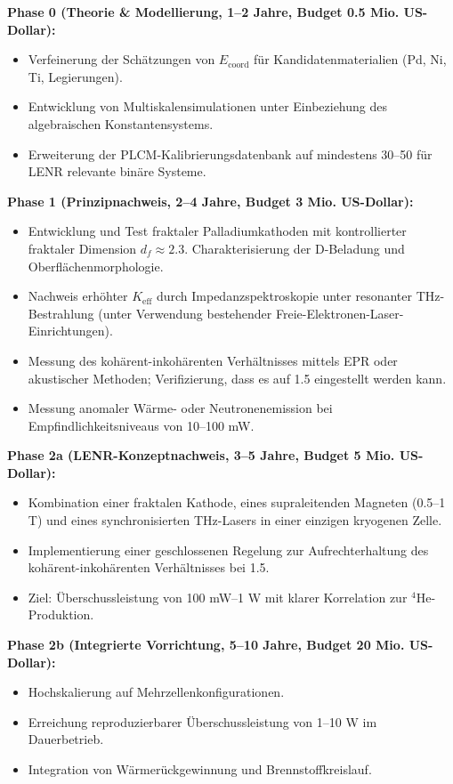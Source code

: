 \documentclass[12pt]{article}
\theoremstyle{remark}
\newcommand{\Keff}{K_{\mathrm{eff}}}
\begin{document}
	\textbf{Phase 0 (Theorie \& Modellierung, 1–2 Jahre, Budget 0.5 Mio. US-Dollar):}
	\begin{itemize}
		\item Verfeinerung der Schätzungen von \(E_{\mathrm{coord}}\) für Kandidatenmaterialien (Pd, Ni, Ti, Legierungen).
		\item Entwicklung von Multiskalensimulationen unter Einbeziehung des algebraischen Konstantensystems.
		\item Erweiterung der PLCM-Kalibrierungsdatenbank auf mindestens 30–50 für LENR relevante binäre Systeme.
	\end{itemize}
	
	\textbf{Phase 1 (Prinzipnachweis, 2–4 Jahre, Budget 3 Mio. US-Dollar):}
	\begin{itemize}
		\item Entwicklung und Test fraktaler Palladiumkathoden mit kontrollierter fraktaler Dimension \(d_f \approx 2.3\). Charakterisierung der D-Beladung und Oberflächenmorphologie.
		\item Nachweis erhöhter \(\Keff\) durch Impedanzspektroskopie unter resonanter THz-Bestrahlung (unter Verwendung bestehender Freie-Elektronen-Laser-Einrichtungen).
		\item Messung des kohärent-inkohärenten Verhältnisses mittels EPR oder akustischer Methoden; Verifizierung, dass es auf 1.5 eingestellt werden kann.
		\item Messung anomaler Wärme- oder Neutronenemission bei Empfindlichkeitsniveaus von 10–100 mW.
	\end{itemize}
	
	\textbf{Phase 2a (LENR-Konzeptnachweis, 3–5 Jahre, Budget 5 Mio. US-Dollar):}
	\begin{itemize}
		\item Kombination einer fraktalen Kathode, eines supraleitenden Magneten (0.5–1 T) und eines synchronisierten THz-Lasers in einer einzigen kryogenen Zelle.
		\item Implementierung einer geschlossenen Regelung zur Aufrechterhaltung des kohärent-inkohärenten Verhältnisses bei 1.5.
		\item Ziel: Überschussleistung von 100 mW–1 W mit klarer Korrelation zur \(^4\)He-Produktion.
	\end{itemize}
	
	\textbf{Phase 2b (Integrierte Vorrichtung, 5–10 Jahre, Budget 20 Mio. US-Dollar):}
	\begin{itemize}
		\item Hochskalierung auf Mehrzellenkonfigurationen.
		\item Erreichung reproduzierbarer Überschussleistung von 1–10 W im Dauerbetrieb.
		\item Integration von Wärmerückgewinnung und Brennstoffkreislauf.
	\end{itemize}
	
\end{document}
